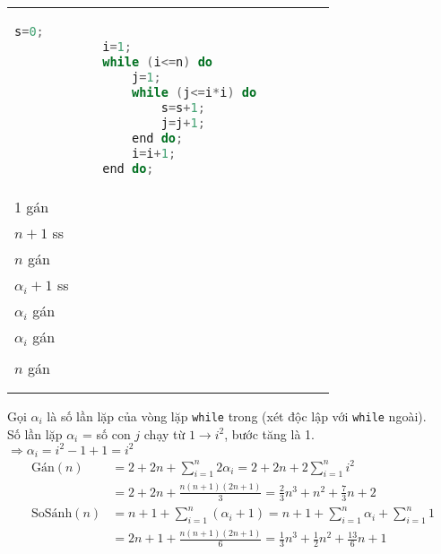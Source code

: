 \documentclass[../HW01.tex]{subfiles}
\begin{document}
\begin{tabular}{l l}
    \begin{minipage}{0.7\textwidth}
        \begin{lstlisting}[language=C]
            s=0;
            i=1;
            while (i<=n) do
                j=1;
                while (j<=i*i) do
                    s=s+1;
                    j=j+1;
                end do;
                i=i+1;
            end do;                     
    \end{lstlisting}
    \end{minipage} 
    &
    \begin{minipage}{0.5\textwidth}
        \texttt{1 gán
            \\1 gán
            \\{\color{purple} $n+1$ ss}
            \\$n$ gán
            \\{\color{purple} $\alpha_i+1$ ss}
            \\$\alpha_i$ gán
            \\$\alpha_i$ gán
            \\
            \\$n$ gán
            \\
            \\
        }
    \end{minipage}
\end{tabular}

\noindent
Gọi $\alpha_i$ là số lần lặp của vòng lặp \verb|while| trong (xét độc lập với \verb|while| ngoài).
\\Số lần lặp $\alpha_i$ = số con $j$ chạy từ $1 \to i^2$, bước tăng là 1.
\\$\Rightarrow \alpha_i=i^2-1+1=i^2$
\begin{align*}
    \text{Gán}(n)&=2+2n+\sum_{i=1}^{n}2\alpha_i=2+2n+2\sum_{i=1}^{n}i^2\\
    &=2+2n+\frac{n(n+1)(2n+1)}{3}=\frac{2}{3}n^3+n^2+\frac{7}{3}n+2\\
    \text{SoSánh}(n)&=n+1+\sum_{i=1}^{n}(\alpha_i+1)=n+1+\sum_{i=1}^{n}\alpha_i+\sum_{i=1}^{n}1\\
    &=2n+1+\frac{n(n+1)(2n+1)}{6}=\frac{1}{3}n^3+\frac{1}{2}n^2+\frac{13}{6}n+1
\end{align*}
\end{document}
